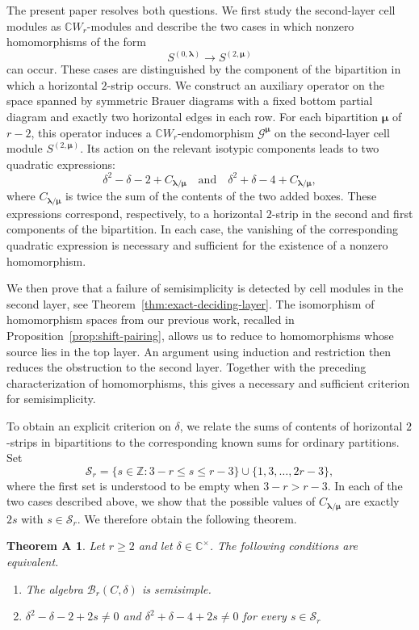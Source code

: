 \documentclass[10pt,a4paper]{amsart}
\newtheorem*{maintheorem}{Theorem A}
\newcommand{\Z}{\mathbb{Z}}
\newcommand{\C}{\mathbb{C}}
\newcommand{\1}{\mathfrak{1}}
\newcommand{\B}{\mathcal{B}}
\begin{document}
The present paper resolves both questions. We first study
the second-layer cell modules as $\C W_r$-modules and
describe the two cases in which nonzero homomorphisms of the form
$$
 S^{(0,\bm\lambda)}\longrightarrow S^{(2,\bm\mu)}
$$
can occur. These cases are distinguished by the component
of the bipartition in which a horizontal $2$-strip occurs. We construct an auxiliary operator on the space spanned by symmetric Brauer diagrams with a fixed bottom partial diagram and exactly two horizontal edges in each row. For each bipartition $\bm\mu$ of $r-2$, this operator induces a $\C W_r$-endomorphism $\mathcal G^{\bm\mu}$ on the second-layer
cell module $S^{(2,\bm\mu)}$. Its action on the relevant isotypic components leads to two quadratic expressions:
$$
\delta^2-\delta-2+C_{\bm\lambda/\bm\mu}
\quad\text{and}\quad
\delta^2+\delta-4+C_{\bm\lambda/\bm\mu},
$$
where $C_{\bm\lambda/\bm\mu}$ is twice the sum of the contents of the two added boxes. These expressions correspond, respectively, to a horizontal
$2$-strip in the second and first components of the bipartition.
In each case, the vanishing of the corresponding quadratic
expression is necessary and sufficient for the existence
of a nonzero homomorphism.

We then prove that a failure of semisimplicity is detected
by cell modules in the second layer, see
Theorem~\ref{thm:exact-deciding-layer}.
The isomorphism of homomorphism spaces from our previous
work, recalled in Proposition~\ref{prop:shift-pairing},
allows us to reduce to homomorphisms whose source lies
in the top layer. An argument using induction and
restriction then reduces the obstruction to the second
layer. Together with the preceding characterization of
homomorphisms, this gives a necessary and sufficient
criterion for semisimplicity.

To obtain an explicit criterion on $\delta$, we relate the sums of contents of horizontal $2$-strips in bipartitions to the corresponding known sums for ordinary partitions.
Set
\begin{equation}\label{eq:exact-index-set}
\mathscr S_r= \{s\in\Z:3-r\leq s\leq r-3\}
\cup\{1,3,\ldots,2r-3\},
\end{equation}
where the first set is understood to be empty when $3-r>r-3$. In each of the two cases described above, we show that the possible values of $C_{\bm\lambda/\bm\mu}$ are exactly $2s$ with $s\in\mathscr S_r$. We therefore obtain the following theorem.

\begin{maintheorem}
Let $r\geq 2$ and let $\delta\in\C^{\times}$.  The following conditions are
equivalent.
\begin{enumerate}
\item The algebra $\B_r(C,\delta)$ is semisimple.
\item $ \delta^2-\delta-2+2s\neq 0$ and 
$\delta^2+\delta-4+2s\neq 0$ for every $s\in\mathscr S_r$ 
\end{enumerate}
\end{maintheorem}
\end{document}
